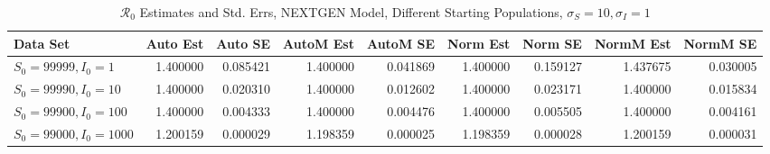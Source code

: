 \documentclass[12pt]{article}
\newcommand{\rr}{\ensuremath{\mathcal{R}_0}}
\begin{document}
\begin{table}[H]
	
	\caption{$\rr$ Estimates and Std. Errs, NEXTGEN Model,
		Different Starting Populations, 
		$\sigma_S = 10, \sigma_I = 1$}
	\begin{footnotesize}
		\hskip -1.7cm
	\begin{tabular}{l|r|r|r|r|r|r|r|r}
		\hline
		Data Set & Auto Est & Auto SE & AutoM Est & AutoM SE & Norm Est & Norm SE & NormM Est & NormM SE\\
		\hline
		$S_0 = 99999, I_0 = 1$ & 1.400000 & 0.085421 & 1.400000 & 0.041869 & 1.400000 & 0.159127 & 1.437675 & 0.030005\\
		\hline
		$S_0 = 99990, I_0 = 10$ & 1.400000 & 0.020310 & 1.400000 & 0.012602 & 1.400000 & 0.023171 & 1.400000 & 0.015834\\
		\hline
		$S_0 = 99900, I_0 = 100$ & 1.400000 & 0.004333 & 1.400000 & 0.004476 & 1.400000 & 0.005505 & 1.400000 & 0.004161\\
		\hline
		$S_0 = 99000, I_0 = 1000$ & 1.200159 & 0.000029 & 1.198359 & 0.000025 & 1.198359 & 0.000028 & 1.200159 & 0.000031\\
		\hline
	\end{tabular}
\end{footnotesize}
\end{table}
\end{document}
